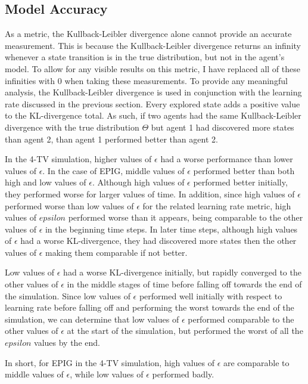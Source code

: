 \documentclass[12pt]{thesis}
\begin{document}
\subsection{Model Accuracy}
As a metric, the Kullback-Leibler divergence alone cannot provide an accurate measurement. This is because the Kullback-Leibler divergence returns an infinity whenever a state transition is in the true distribution, but not in the agent's model. To allow for any visible results on this metric, I have replaced all of these infinities with 0 when taking these measurements. To provide any meaningful analysis, the Kullback-Leibler divergence is used in conjunction with the learning rate discussed in the previous section. Every explored state adds a positive value to the KL-divergence total. As such, if two agents had the same Kullback-Leibler divergence with the true distribution $\Theta$ but agent 1 had discovered more states than agent 2, than agent 1 performed better than agent 2.

In the 4-TV simulation, higher values of $\epsilon$ had a worse performance than lower values of $\epsilon$. In the case of EPIG, middle values of $\epsilon$ performed better than both high and low values of $\epsilon$. Although high values of $\epsilon$ performed better initially, they performed worse for larger values of time. In addition, since high values of $\epsilon$ performed worse than low values of $\epsilon$ for the related learning rate metric, high values of $epsilon$ performed worse than it appears, being comparable to the other values of $\epsilon$ in the beginning time steps. In later time steps, although high values of $\epsilon$ had a worse KL-divergence, they had discovered more states then the other values of $\epsilon$ making them comparable if not better. 

Low values of $\epsilon$ had a worse KL-divergence initially, but rapidly converged to the other values of $\epsilon$ in the middle stages of time before falling off towards the end of the simulation. Since low values of $\epsilon$ performed well initially with respect to learning rate before falling off and performing the worst towards the end of the simulation, we can determine that low values of $\epsilon$ performed comparable to the other values of $\epsilon$ at the start of the simulation, but performed the worst of all the $epsilon$ values by the end.

In short, for EPIG in the 4-TV simulation, high values of $\epsilon$ are comparable to middle values of $\epsilon$, while low values of $\epsilon$ performed badly.
\end{document}
